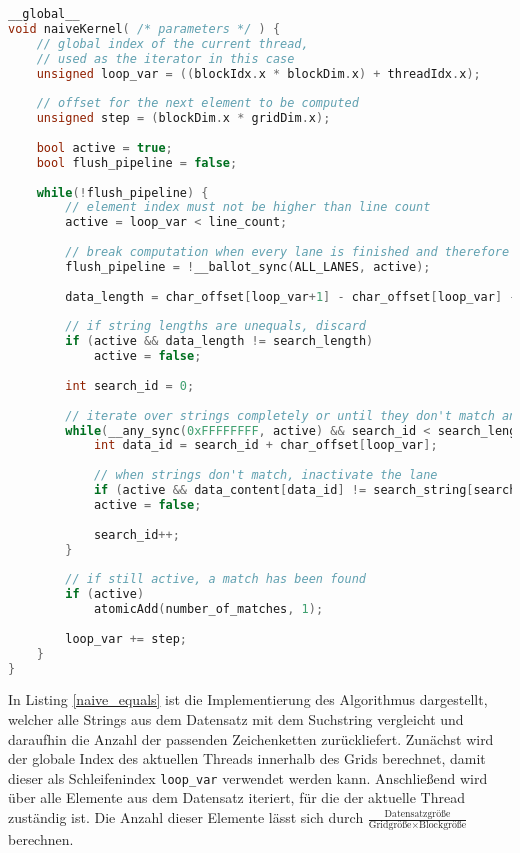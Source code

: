 \begin{lstlisting}[language=C++,
	caption=Naive Implementierung des String-Vergleichs,
	label=naive_equals]
__global__
void naiveKernel( /* parameters */ ) {
	// global index of the current thread,
	// used as the iterator in this case
	unsigned loop_var = ((blockIdx.x * blockDim.x) + threadIdx.x);
	
	// offset for the next element to be computed
	unsigned step = (blockDim.x * gridDim.x);
	
	bool active = true;
	bool flush_pipeline = false;
	
	while(!flush_pipeline) {
		// element index must not be higher than line count
		active = loop_var < line_count;
		
		// break computation when every lane is finished and therefore inactive
		flush_pipeline = !__ballot_sync(ALL_LANES, active);
		
		data_length = char_offset[loop_var+1] - char_offset[loop_var] - 1;
		
		// if string lengths are unequals, discard
		if (active && data_length != search_length)
			active = false;
		
		int search_id = 0;
		
		// iterate over strings completely or until they don't match anymore
		while(__any_sync(0xFFFFFFFF, active) && search_id < search_length) {
			int data_id = search_id + char_offset[loop_var];
			
			// when strings don't match, inactivate the lane
			if (active && data_content[data_id] != search_string[search_id])
			active = false;
			
			search_id++;
		}
		
		// if still active, a match has been found
		if (active)
			atomicAdd(number_of_matches, 1);
		
		loop_var += step;
	}
}
\end{lstlisting}

In Listing \ref{naive_equals} ist die Implementierung des Algorithmus dargestellt, welcher alle Strings aus dem Datensatz mit dem Suchstring vergleicht und daraufhin die Anzahl der passenden Zeichenketten zurückliefert.
Zunächst wird der globale Index des aktuellen Threads innerhalb des Grids berechnet, damit dieser als Schleifenindex \texttt{loop\_var} verwendet werden kann.
Anschließend wird über alle Elemente aus dem Datensatz iteriert, für die der aktuelle Thread zuständig ist.
Die Anzahl dieser Elemente lässt sich durch $\frac{\text{Datensatzgröße}}{\text{Gridgröße} \times \text{Blockgröße}}$ berechnen.

